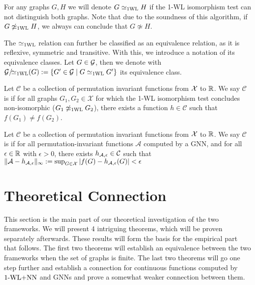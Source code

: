 \begin{definition}[1-WL Relation]
    For any graphs $G,H$ we will denote $G \simeq_{\text{1WL}} H$ if the 1-WL isomorphism test can not distinguish both graphs. Note that due to the soundness of this algorithm, if $G \not\simeq_{\text{1WL}} H$, we always can conclude that $G \not\simeq H$.
\end{definition}

The $\simeq_{\text{1WL}}$ relation can further be classified as an equivalence relation, as it is reflexive, symmetric and transitive. With this, we introduce a notation of its equivalence classes. Let $G \in \mathcal{G}$, then we denote with $\mathcal{G}/\!{\simeq_{\text{1WL}}}(G): = \{ G' \in \mathcal{G} \mid G \simeq_{\text{1WL}} G' \}$ its equivalence class.

\begin{definition}[$\wldisc$]
    Let $\mathcal{C}$ be a collection of permutation invariant functions from $\mathcal{X}$ to $\mathbb{R}$. We say $\mathcal{C}$ is \textbf{\wldisc} if for all graphs $G_1, G_2 \in \mathcal{X}$ for which the 1-WL isomorphism test concludes non-isomorphic ($G_1 \not\simeq_{\text{1WL}} G_2$), there exists a function $h \in \mathcal{C}$ such that $f(G_1) \neq f(G_2)$.
\end{definition}

\begin{definition}[$\gapp$]
    Let $\mathcal{C}$ be a collection of permutation invariant functions from $\mathcal{X}$ to $\mathbb{R}$. We say $\mathcal{C}$ is \textbf{\gapp} if for all permutation-invariant functions $\mathcal{A}$ computed by a GNN, and for all $\epsilon \in \mathbb{R}$ with $\epsilon > 0$, there exists $h_{\mathcal{A},\epsilon} \in \mathcal{C}$ such that $\| \mathcal{A} - h_{\mathcal{A},\epsilon} \|_\infty := \sup_{G \in \mathcal{X}} |f(G) - h_{\mathcal{A},\epsilon}(G)| < \epsilon$
\end{definition}

\section{Theoretical Connection}
This section is the main part of our theoretical investigation of the two frameworks. We will present 4 intriguing theorems, which will be proven separately afterwards. These results will form the basis for the empirical part that follows. The first two theorems will establish an equivalence between the two frameworks when the set of graphs is finite. The last two theorems will go one step further and establish a connection for continuous functions computed by $\text{1-WL+NN}$ and GNNs and prove a somewhat weaker connection between them.

